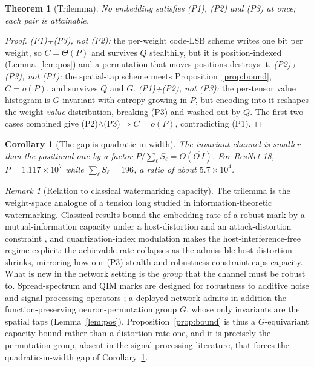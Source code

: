 \documentclass[10pt,journal]{IEEEtran}
\newtheorem{theorem}{Theorem}
\newtheorem{corollary}{Corollary}
\theoremstyle{remark}
\newtheorem{remark}{Remark}
\begin{document}
\begin{theorem}[Trilemma]\label{thm:tri}
No embedding satisfies \textup{(P1)}, \textup{(P2)} and \textup{(P3)} at once; each
pair is attainable.
\end{theorem}
\begin{proof}
\emph{(P1)+(P3), not (P2):} the per-weight code-LSB scheme writes one bit per weight,
so $C=\Theta(P)$ and survives $Q$ stealthily, but it is position-indexed
(Lemma~\ref{lem:pos}) and a permutation that moves positions destroys it. \emph{(P2)+(P3),
not (P1):} the spatial-tap scheme meets Proposition~\ref{prop:bound}, $C=o(P)$, and
survives $Q$ and $G$. \emph{(P1)+(P2), not (P3):} the per-tensor value histogram is
$G$-invariant with entropy growing in $P$, but encoding into it reshapes the weight
\emph{value} distribution, breaking (P3) and washed out by $Q$. The first two cases
combined give (P2)$\wedge$(P3)$\Rightarrow C=o(P)$, contradicting (P1).
\end{proof}

\begin{corollary}[The gap is quadratic in width]\label{cor:gap}
The invariant channel is smaller than the positional one by a factor
$P/\sum_\ell S_\ell=\Theta(\overline{O\,I})$. For ResNet-18, $P=1.117\times10^{7}$ while
$\sum_\ell S_\ell=196$, a ratio of about $5.7\times10^{4}$.
\end{corollary}

\begin{remark}[Relation to classical watermarking capacity]\label{rem:classical}
The trilemma is the weight-space analogue of a tension long studied in
information-theoretic watermarking. Classical results bound the embedding rate of a
robust mark by a mutual-information capacity under a host-distortion and an
attack-distortion constraint \cite{moulin2003watermarking}, and quantization-index
modulation \cite{chen2001qim} makes the host-interference-free regime explicit: the
achievable rate collapses as the admissible host distortion shrinks, mirroring how our
(P3) stealth-and-robustness constraint caps capacity. What is new in the network setting
is the \emph{group} that the channel must be robust to. Spread-spectrum and QIM marks are
designed for robustness to additive noise and signal-processing operators
\cite{cox1997spread,chen2001qim}; a deployed network admits in addition the
function-preserving neuron-permutation group $G$, whose only invariants are the spatial
taps (Lemma~\ref{lem:pos}). Proposition~\ref{prop:bound} is thus a $G$-equivariant
capacity bound rather than a distortion-rate one, and it is precisely the permutation
group, absent in the signal-processing literature, that forces the quadratic-in-width gap
of Corollary~\ref{cor:gap}.
\end{remark}
\end{document}
